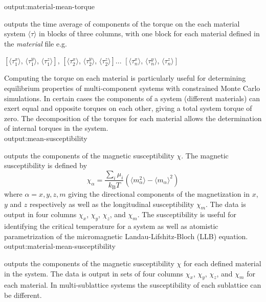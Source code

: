 
{\zicf output:material-mean-torque} outputs the time average of components of the torque on the each material system $\langle\tau\rangle$ in blocks of three columns, with one block for each material defined in the \textit{material} file e.g.

\begin{center}
$\left[ \langle\tau_1^x \rangle \right.$, $\langle\tau_1^y \rangle$, $\left. \langle\tau_1^z \rangle \right]$,
$\left[ \langle\tau_2^x \rangle \right.$, $\langle\tau_2^y \rangle$, $\left. \langle\tau_2^z \rangle \right]$...
$\left[ \langle\tau_n^x \rangle \right.$, $\langle\tau_n^y \rangle$, $\left. \langle\tau_n^z \rangle \right]$
\end{center}

Computing the torque on each material is particularly useful for determining equilibrium properties of multi-component systems with constrained Monte Carlo simulations. In certain cases the components of a system (different materials) can exert equal and opposite torques on each other, giving a total system torque of zero. The decomposition of the torques for each material allows the determination of internal torques in the system.\\

{\zicf output:mean-susceptibility} outputs the components of the magnetic susceptibility $\chi$. The magnetic susceptibility is defined by
\begin{equation*}
\chi_{\alpha} = \frac{\sum_i \mu_i}{k_{\mathrm{B}}T}\left(\langle m_{\alpha}^2\rangle - \langle m_{\alpha}\rangle^2 \right)
\end{equation*}
where $\alpha = x,y,z,m$ giving the directional components of the magnetization in $x$, $y$ and $z$ respectively as well as the longitudinal susceptibility $\chi_m$. The data is output in four columns $\chi_x$, $\chi_y$, $\chi_z$, and $\chi_m$. The susceptibility is useful for identifying the critical temperature for a system as well as atomistic parametrization of the micromagnetic  Landau-Lifshitz-Bloch (LLB) equation.\\

{\zicf output:material-mean-susceptibility} outputs
the components of the magnetic susceptibility $\chi$ for each defined material in the system. The data is output in sets of
four columns $\chi_x$, $\chi_y$, $\chi_z$, and $\chi_m$ for each material. In multi-sublattice systems the susceptibility of
each sublattice can be different.\\


